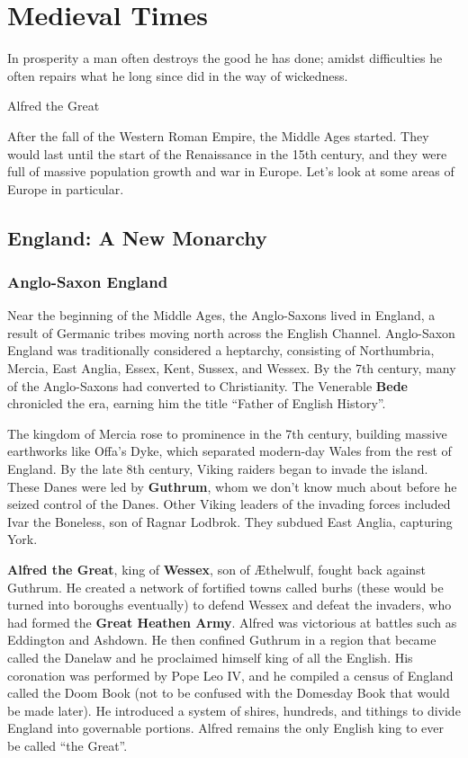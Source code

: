 \chapter{Medieval Times}

\epigraph{%
  In prosperity a man often destroys the good he has done;
  amidst difficulties he often repairs what he long since did in the way of wickedness.
}{Alfred the Great}

After the fall of the Western Roman Empire, the Middle Ages started.
They would last until the start of the Renaissance in the 15th century,
and they were full of massive population growth and war in Europe.
Let's look at some areas of Europe in particular.

\section{England: A New Monarchy}

\subsection*{Anglo-Saxon England}

Near the beginning of the Middle Ages, the Anglo-Saxons lived in England,
a result of Germanic tribes moving north across the English Channel.
Anglo-Saxon England was traditionally considered a heptarchy, consisting of
Northumbria, Mercia, East Anglia, Essex, Kent, Sussex, and Wessex.
By the 7th century, many of the Anglo-Saxons had converted to Christianity.
The Venerable \textbf{Bede} chronicled the era, earning him the title ``Father of English History''.

The kingdom of Mercia rose to prominence in the 7th century,
building massive earthworks like Offa's Dyke,
which separated modern-day Wales from the rest of England.
By the late 8th century, Viking raiders began to invade the island.
These Danes were led by \textbf{Guthrum}, whom we don't know much about before he seized control of the Danes.
Other Viking leaders of the invading forces included Ivar the Boneless, son of Ragnar Lodbrok.
They subdued East Anglia, capturing York.

\textbf{Alfred the Great}, king of \textbf{Wessex}, son of \AE{}thelwulf, fought back against Guthrum.
He created a network of fortified towns called burhs (these would be turned into boroughs eventually)
to defend Wessex and defeat the invaders, who had formed the \textbf{Great Heathen Army}.
Alfred was victorious at battles such as Eddington and Ashdown.
He then confined Guthrum in a region that became called the Danelaw
and he proclaimed himself king of all the English.
His coronation was performed by Pope Leo IV,
and he compiled a census of England called the Doom Book
(not to be confused with the Domesday Book that would be made later).
He introduced a system of shires, hundreds, and tithings to divide England into governable portions.
Alfred remains the only English king to ever be called ``the Great''.

